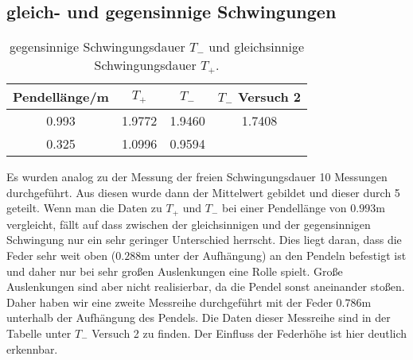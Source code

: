   \subsection{gleich- und gegensinnige Schwingungen}
    \begin{table}
      \centering
        \caption{gegensinnige Schwingungsdauer $T_{-}$ und gleichsinnige Schwingungsdauer $T_{+}$.}
        \label{tab:aufgabe23}
        \begin{tabular}{S S S S}
          \toprule
          {Pendellänge/m} & {$T_{+}$} & {$T_{-}$} & {$T_{-}$ Versuch 2}\\
                     & 1.9772    & 1.9460   & 1.7408 \\
          0.325           & 1.0996   & 0.9594    &         \\
          \bottomrule
        \end{tabular}
    \end{table}
    Es wurden analog zu der Messung der freien Schwingungsdauer 10 Messungen durchgeführt. Aus diesen wurde dann der Mittelwert
    gebildet und dieser durch 5 geteilt. Wenn man die Daten zu $T_{+}$ und $T_{-}$ bei einer Pendellänge von $0.993$m vergleicht,
    fällt auf dass zwischen der gleichsinnigen und der gegensinnigen Schwingung nur ein sehr geringer Unterschied herrscht. Dies
    liegt daran, dass die Feder sehr weit oben ($0.288$m unter der Aufhängung) an den Pendeln befestigt ist und daher nur bei
    sehr großen Auslenkungen eine Rolle spielt. Große Auslenkungen sind aber nicht realisierbar, da die Pendel sonst aneinander
    stoßen. Daher haben wir eine zweite Messreihe durchgeführt mit der Feder $0.786$m unterhalb der Aufhängung des Pendels. Die
    Daten dieser Messreihe sind in der Tabelle unter $T_{-}$ Versuch 2 zu finden. Der Einfluss der Federhöhe ist hier deutlich
    erkennbar.
